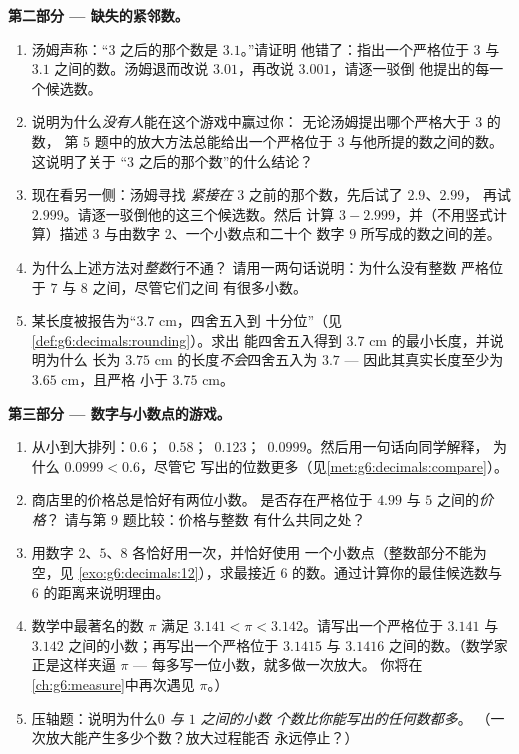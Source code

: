 \begin{problem}
\medskip
\noindent\textbf{第二部分 --- 缺失的紧邻数。}
\begin{enumerate}[resume]
  \item 汤姆声称：“$3$ 之后的那个数是 $3.1$。”请证明
        他错了：指出一个严格位于 $3$ 与
        $3.1$ 之间的数。汤姆退而改说 $3.01$，再改说 $3.001$，请逐一驳倒
        他提出的每一个候选数。
  \item 说明为什么\emph{没有人}能在这个游戏中赢过你：
        无论汤姆提出哪个严格大于 $3$ 的数，
        第 5 题中的放大方法总能给出一个严格位于
        $3$ 与他所提的数之间的数。这说明了关于
        “$3$ 之后的那个数”的什么结论？
  \item 现在看另一侧：汤姆寻找
        \emph{紧接在} $3$ 之前的那个数，先后试了 $2.9$、$2.99$，
        再试 $2.999$。请逐一驳倒他的这三个候选数。然后
        计算 $3 - 2.999$，并（不用竖式计算）描述
        $3$ 与由数字 $2$、一个小数点和二十个
        数字 $9$ 所写成的数之间的差。
  \item 为什么上述方法对\emph{整数}行不通？
        请用一两句话说明：为什么没有整数
        严格位于 $7$ 与 $8$ 之间，尽管它们之间
        有很多小数。
  \item 某长度被报告为“$3.7$ cm，四舍五入到
        十分位”（见\cref{def:g6:decimals:rounding}）。求出
        能四舍五入得到 $3.7$ cm 的最小长度，并说明为什么
        长为 $3.75$ cm 的长度\emph{不会}四舍五入为 $3.7$ ---
        因此其真实长度至少为 $3.65$ cm，且严格
        小于 $3.75$ cm。
\end{enumerate}

\medskip
\noindent\textbf{第三部分 --- 数字与小数点的游戏。}
\begin{enumerate}[resume]
  \item 从小到大排列：$0.6$；\ $0.58$；\
        $0.123$；\ $0.0999$。然后用一句话向同学解释，
        为什么 $0.0999 < 0.6$，尽管它
        写出的位数更多（见\cref{met:g6:decimals:compare}）。
  \item 商店里的价格总是恰好有两位小数。
        是否存在严格位于 $4.99$ 与 $5$ 之间的\emph{价格}？
        请与第 9 题比较：价格与整数
        有什么共同之处？
  \item 用数字 $2$、$5$、$8$ 各恰好用一次，并恰好使用
        一个小数点（整数部分不能为空，见
        \cref{exo:g6:decimals:12}），求最接近
        $6$ 的数。通过计算你的最佳候选数与
        $6$ 的距离来说明理由。
  \item 数学中最著名的数 $\pi$ 满足
        $3.141 < \pi < 3.142$。请写出一个严格位于
        $3.141$ 与 $3.142$ 之间的小数；再写出一个严格位于
        $3.1415$ 与 $3.1416$ 之间的数。（数学家正是这样夹逼 $\pi$ ---
        每多写一位小数，就多做一次放大。
        你将在
        \cref{ch:g6:measure}中再次遇见 $\pi$。）
  \item 压轴题：说明为什么\emph{$0$ 与 $1$ 之间的小数
        个数比你能写出的任何数都多}。
        （一次放大能产生多少个数？放大过程能否
        永远停止？）
\end{enumerate}
\end{problem}
